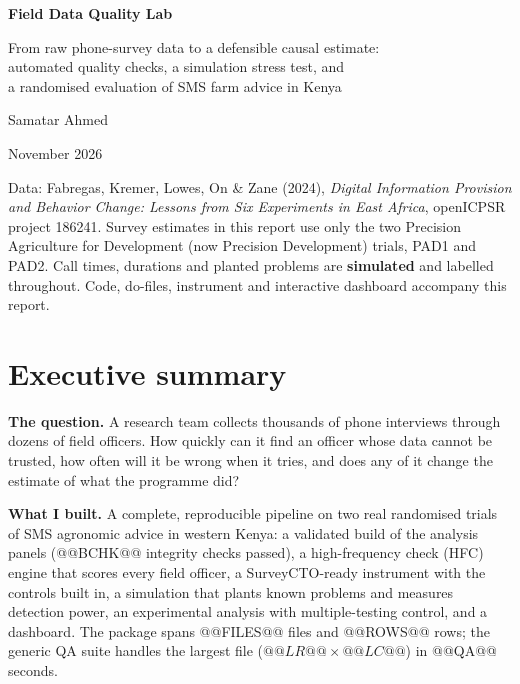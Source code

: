 \documentclass[11pt,a4paper]{article}
\begin{document}
\thispagestyle{empty}
\vspace*{1.2cm}
{\color{white}\sffamily
{\Huge\bfseries Field Data Quality Lab\par}\vspace{0.6em}
{\Large From raw phone-survey data to a defensible causal estimate:\\[2pt] automated quality checks, a simulation stress test, and\\[2pt] a randomised evaluation of SMS farm advice in Kenya\par}}
\vspace{5.6cm}
{\sffamily\large Samatar Ahmed\par}
{\sffamily\color{mute} November 2026\par}
\vspace{1.2em}
\begin{minipage}{0.82\textwidth}\small
Data: Fabregas, Kremer, Lowes, On \& Zane (2024), \emph{Digital Information Provision and Behavior Change: Lessons from Six Experiments in East Africa}, openICPSR project 186241. Survey estimates in this report use only the two Precision Agriculture for Development (now Precision Development) trials, PAD1 and PAD2. Call times, durations and planted problems are \textbf{simulated} and labelled throughout. Code, do-files, instrument and interactive dashboard accompany this report.
\end{minipage}
\clearpage
\tableofcontents
\clearpage

\section*{Executive summary}
\textbf{The question.} A research team collects thousands of phone interviews through dozens of field officers. How quickly can it find an officer whose data cannot be trusted, how often will it be wrong when it tries, and does any of it change the estimate of what the programme did?

\textbf{What I built.} A complete, reproducible pipeline on two real randomised trials of SMS agronomic advice in western Kenya: a validated build of the analysis panels (@@BCHK@@ integrity checks passed), a high-frequency check (HFC) engine that scores every field officer, a SurveyCTO-ready instrument with the controls built in, a simulation that plants known problems and measures detection power, an experimental analysis with multiple-testing control, and a dashboard. The package spans @@FILES@@ files and @@ROWS@@ rows; the generic QA suite handles the largest file ($@@LR@@\times@@LC@@$) in @@QA@@ seconds.
\end{document}
